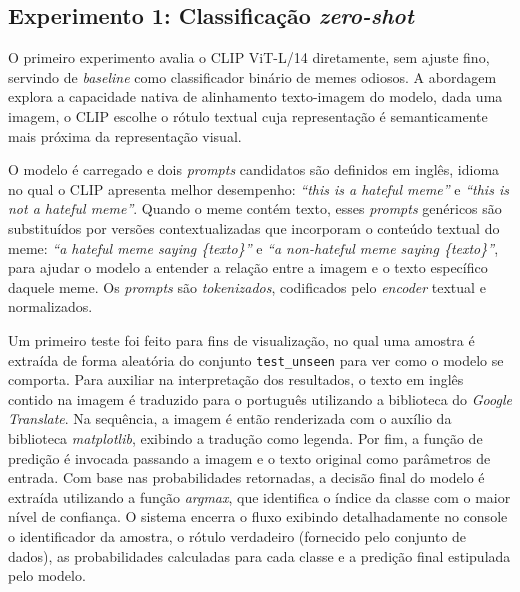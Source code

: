 \subsection{Experimento 1: Classificação \textit{zero-shot}}

O primeiro experimento avalia o CLIP ViT-L/14 diretamente, sem ajuste fino, servindo de \textit{baseline} como classificador binário de memes odiosos. A abordagem explora a capacidade nativa de alinhamento texto-imagem do modelo, dada uma imagem, o CLIP escolhe o rótulo textual cuja representação é semanticamente mais próxima da representação visual.

O modelo é carregado e dois \textit{prompts} candidatos são definidos em inglês, idioma no qual o CLIP apresenta melhor desempenho: \textit{``this is a hateful meme''} e \textit{``this is not a hateful meme''}. Quando o meme contém texto, esses \textit{prompts} genéricos são substituídos por versões contextualizadas que incorporam o conteúdo textual do meme: \textit{``a hateful meme saying \{texto\}''} e \textit{``a non-hateful meme saying \{texto\}''}, para ajudar o modelo a entender a relação entre a imagem e o texto específico daquele meme. Os \textit{prompts} são \textit{tokenizados}, codificados pelo \textit{encoder} textual e normalizados.

Um primeiro teste foi feito para fins de visualização, no qual uma amostra é extraída de forma aleatória do conjunto \texttt{test\_unseen} para ver como o modelo se comporta. Para auxiliar na interpretação dos resultados, o texto em inglês contido na imagem é traduzido para o português utilizando a biblioteca do \textit{Google Translate}. Na sequência, a imagem é então renderizada com o auxílio da biblioteca \textit{matplotlib}, exibindo a tradução como legenda. Por fim, a função de predição é invocada passando a imagem e o texto original como parâmetros de entrada. Com base nas probabilidades retornadas, a decisão final do modelo é extraída utilizando a função \textit{argmax}, que identifica o índice da classe com o maior nível de confiança. O sistema encerra o fluxo exibindo detalhadamente no console o identificador da amostra, o rótulo verdadeiro (fornecido pelo conjunto de dados), as probabilidades calculadas para cada classe e a predição final estipulada pelo modelo.


